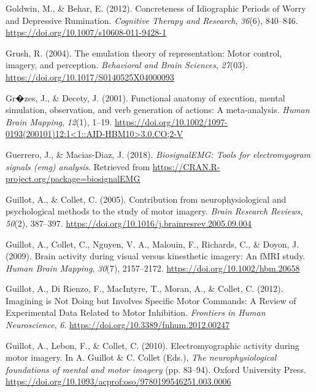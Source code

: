 \documentclass[a4paper,12pt,twoside,openright,oldfontcommands]{memoir}
\begin{document}
\hypertarget{ref-goldwin_concreteness_2012}{}
Goldwin, M., \& Behar, E. (2012). Concreteness of Idiographic Periods of
Worry and Depressive Rumination. \emph{Cognitive Therapy and Research},
\emph{36}(6), 840--846. \url{https://doi.org/10.1007/s10608-011-9428-1}

\hypertarget{ref-grush_emulation_2004}{}
Grush, R. (2004). The emulation theory of representation: Motor control,
imagery, and perception. \emph{Behavioral and Brain Sciences},
\emph{27}(03). \url{https://doi.org/10.1017/S0140525X04000093}

\hypertarget{ref-grzes_functional_2001}{}
Gr�zes, J., \& Decety, J. (2001). Functional anatomy of execution,
mental simulation, observation, and verb generation of actions: A
meta-analysis. \emph{Human Brain Mapping}, \emph{12}(1), 1--19.
\href{https://doi.org/10.1002/1097-0193(200101)12:1\%3C1::AID-HBM10\%3E3.0.CO;2-V}{https://doi.org/10.1002/1097-0193(200101)12:1\textless{}1::AID-HBM10\textgreater{}3.0.CO;2-V}

\hypertarget{ref-R-biosignalEMG}{}
Guerrero, J., \& Macias-Diaz, J. (2018). \emph{BiosignalEMG: Tools for
electromyogram signals (emg) analysis}. Retrieved from
\url{https://CRAN.R-project.org/package=biosignalEMG}

\hypertarget{ref-guillot_contribution_2005}{}
Guillot, A., \& Collet, C. (2005). Contribution from neurophysiological
and psychological methods to the study of motor imagery. \emph{Brain
Research Reviews}, \emph{50}(2), 387--397.
\url{https://doi.org/10.1016/j.brainresrev.2005.09.004}

\hypertarget{ref-guillot_brain_2009}{}
Guillot, A., Collet, C., Nguyen, V. A., Malouin, F., Richards, C., \&
Doyon, J. (2009). Brain activity during visual versus kinesthetic
imagery: An fMRI study. \emph{Human Brain Mapping}, \emph{30}(7),
2157--2172. \url{https://doi.org/10.1002/hbm.20658}

\hypertarget{ref-guillot_imagining_2012}{}
Guillot, A., Di Rienzo, F., MacIntyre, T., Moran, A., \& Collet, C.
(2012). Imagining is Not Doing but Involves Specific Motor Commands: A
Review of Experimental Data Related to Motor Inhibition. \emph{Frontiers
in Human Neuroscience}, \emph{6}.
\url{https://doi.org/10.3389/fnhum.2012.00247}

\hypertarget{ref-guillot_electromyographic_2010}{}
Guillot, A., Lebon, F., \& Collet, C. (2010). Electromyographic activity
during motor imagery. In A. Guillot \& C. Collet (Eds.), \emph{The
neurophysiological foundations of mental and motor imagery} (pp.
83--94). Oxford University Press.
\url{https://doi.org/10.1093/acprof:oso/9780199546251.003.0006}
\end{document}
